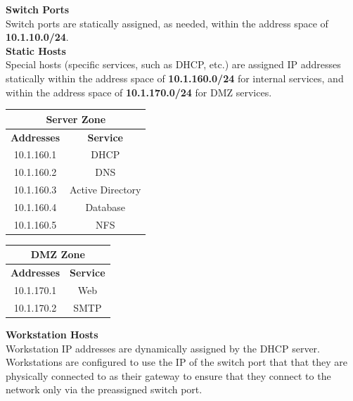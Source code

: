 \noindent
\textbf{Switch Ports} \\
Switch ports are statically assigned, as needed, within the address space of 
\textbf{10.1.10.0/24}. \\

\noindent
\textbf{Static Hosts} \\
Special hosts (specific services, such as DHCP, etc.) are assigned IP addresses 
statically within the address space of \textbf{10.1.160.0/24} for internal 
services, and within the address space of \textbf{10.1.170.0/24} for DMZ 
services. \\

\begin{center}
	\begin{tabular}[m]{| c | c |}
		\hline
		\multicolumn{2}{|c|}{Server Zone}\\
		\hline
		\textbf{Addresses} & \textbf{Service}\\
		\hline
		10.1.160.1 & DHCP \\
		\hline
		10.1.160.2 & DNS \\
		\hline
		10.1.160.3 & Active Directory \\
		\hline
		10.1.160.4 & Database \\
		\hline
		10.1.160.5 & NFS \\
		\hline
	\end{tabular}
\end{center}

\vspace{1em}


\begin{center}
	\begin{tabular}[m]{| c | c |}
		\hline
		\multicolumn{2}{|c|}{DMZ Zone}\\
		\hline
		\textbf{Addresses} & \textbf{Service}\\
		\hline
		10.1.170.1 & Web \\
		\hline
		10.1.170.2 & SMTP \\
		\hline
	\end{tabular}
\end{center}

\vspace{1em}

\noindent
\textbf{Workstation Hosts} \\
Workstation IP addresses are dynamically assigned by the DHCP server. 
Workstations are configured to use the IP of the switch port that that they are
physically connected to as their gateway to ensure that they connect to the 
network only via the preassigned switch port. \\

